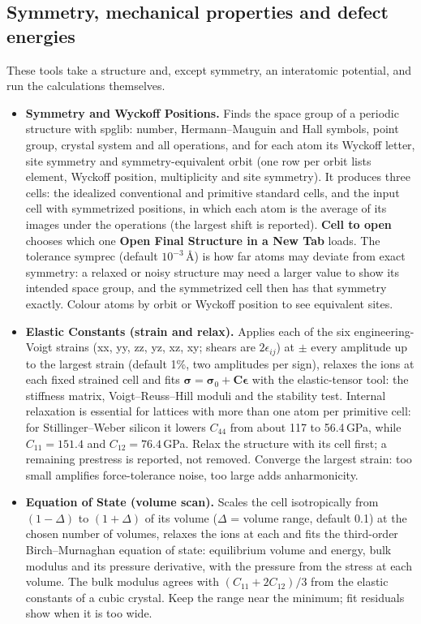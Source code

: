 \subsection{Symmetry, mechanical properties and defect energies}\label{sec:property-workflows}
These tools take a structure and, except symmetry, an interatomic potential, and run the calculations themselves.
\begin{itemize}
\item \textbf{Symmetry and Wyckoff Positions.} Finds the space group of a periodic structure with spglib: number, Hermann--Mauguin and Hall symbols, point group, crystal system and all operations, and for each atom its Wyckoff letter, site symmetry and symmetry-equivalent orbit (one row per orbit lists element, Wyckoff position, multiplicity and site symmetry). It produces three cells: the idealized conventional and primitive standard cells, and the input cell with symmetrized positions, in which each atom is the average of its images under the operations (the largest shift is reported). \textbf{Cell to open} chooses which one \textbf{Open Final Structure in a New Tab} loads. The tolerance $\mathrm{symprec}$ (default $10^{-3}$\,\AA) is how far atoms may deviate from exact symmetry: a relaxed or noisy structure may need a larger value to show its intended space group, and the symmetrized cell then has that symmetry exactly. Colour atoms by orbit or Wyckoff position to see equivalent sites.
\item \textbf{Elastic Constants (strain and relax).} Applies each of the six engineering-Voigt strains (xx, yy, zz, yz, xz, xy; shears are $2\epsilon_{ij}$) at $\pm$ every amplitude up to the largest strain (default 1\%, two amplitudes per sign), relaxes the ions at each fixed strained cell and fits $\boldsymbol\sigma = \boldsymbol\sigma_0 + \mathbf C\boldsymbol\epsilon$ with the elastic-tensor tool: the stiffness matrix, Voigt--Reuss--Hill moduli and the stability test. Internal relaxation is essential for lattices with more than one atom per primitive cell: for Stillinger--Weber silicon it lowers $C_{44}$ from about 117 to 56.4\,GPa, while $C_{11}=151.4$ and $C_{12}=76.4$\,GPa. Relax the structure with its cell first; a remaining prestress is reported, not removed. Converge the largest strain: too small amplifies force-tolerance noise, too large adds anharmonicity.
\item \textbf{Equation of State (volume scan).} Scales the cell isotropically from $(1-\Delta)$ to $(1+\Delta)$ of its volume ($\Delta$ = volume range, default 0.1) at the chosen number of volumes, relaxes the ions at each and fits the third-order Birch--Murnaghan equation of state: equilibrium volume and energy, bulk modulus and its pressure derivative, with the pressure from the stress at each volume. The bulk modulus agrees with $(C_{11}+2C_{12})/3$ from the elastic constants of a cubic crystal. Keep the range near the minimum; fit residuals show when it is too wide.

\end{itemize}
